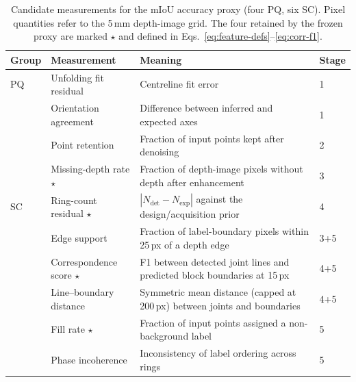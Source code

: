 \documentclass[a4paper,fleqn]{cas-dc}
\begin{document}
\begin{table}[t]
\caption{Candidate measurements for the mIoU accuracy proxy (four PQ, six SC). Pixel quantities refer to the 5\,mm depth-image grid. The four retained by the frozen proxy are marked $\star$ and defined in Eqs.~\eqref{eq:feature-defs}--\eqref{eq:corr-f1}.}
\label{tab:candidate-features}
\centering
\small
\setlength{\tabcolsep}{3pt}
\begin{tabular}{Y{0.05\textwidth} Y{0.27\textwidth} Y{0.45\textwidth} Y{0.16\textwidth}}
\toprule
Group & Measurement & Meaning & Stage \\
\midrule
PQ & Unfolding fit residual & Centreline fit error & 1 \\
 & Orientation agreement & Difference between inferred and expected axes & 1 \\
 & Point retention & Fraction of input points kept after denoising & 2 \\
 & Missing-depth rate $\star$ & Fraction of depth-image pixels without depth after enhancement & 3 \\
SC & Ring-count residual $\star$ & $|N_{\mathrm{det}}-N_{\mathrm{exp}}|$ against the design/acquisition prior & 4 \\
 & Edge support & Fraction of label-boundary pixels within 25\,px of a depth edge & 3+5 \\
 & Correspondence score $\star$ & F1 between detected joint lines and predicted block boundaries at 15\,px & 4+5 \\
 & Line--boundary distance & Symmetric mean distance (capped at 200\,px) between joints and boundaries & 4+5 \\
 & Fill rate $\star$ & Fraction of input points assigned a non-background label & 5 \\
 & Phase incoherence & Inconsistency of label ordering across rings & 5 \\
\bottomrule
\end{tabular}
\end{table}
\end{document}
